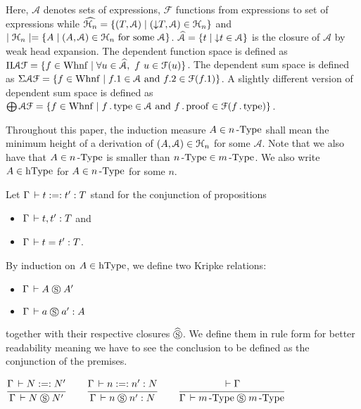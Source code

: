\documentclass[a4paper,english]{lipics-utf8x}
\begin{document}
  \noindent %
  Here, $\mathcal{A}$ denotes sets of expressions, $\mathcal{F}$ functions from
  expressions to set of expressions while
  $\widehat{\mathcal{H}_n} = \{ (T,\mathcal{A}) \mid ({\downarrow} T, \mathcal{A}) \in \mathcal{H}_n \}$
  and $\mid \mathcal{H}_n \mid = \{ A \mid (A, \mathcal{A}) \in \mathcal{H}_n \text{ for some }
  \mathcal{A} \}$.
  $\widehat{\mathcal{A}} = \{ t \mid {\downarrow} t \in \mathcal{A} \}$ is the closure
  of $\mathcal{A}$ by weak head expansion.
  The dependent function space is defined as
  $\Pi \mathcal{A} \mathcal{F} = \{ f \in \operatorname{Whnf} \mid \forall u \in
  \widehat{\mathcal{A}},\ f~u \in \mathcal{F}(u) \}$.
  The dependent sum space is defined as
  $\Sigma \mathcal{A} \mathcal{F} = \{ f \in \operatorname{Whnf} \mid f.1 \in \mathcal{A}
  \text{ and } f.2 \in \mathcal{F}(f.1) \}$.
  A slightly different version of dependent sum space is defined as
  $\bigoplus \mathcal{A} \mathcal{F} = \{ f \in \operatorname{Whnf} \mid f \operatorname{.type} \in
  \mathcal{A} \text{ and } f \operatorname{.proof} \in \mathcal{F}(f \operatorname{.type}) \}$.

  Throughout this paper, the induction measure $A \in n\operatorname{-Type}$ shall mean the
  minimum height of a derivation of $(A, \mathcal{A}) \in \mathcal{H}_n$ for some
  $\mathcal{A}$.
  Note that we also have that $A \in n\operatorname{-Type}$ is smaller than
  $n\operatorname{-Type} \in m\operatorname{-Type}$.
  We also write $A \in \operatorname{hType}$ for $A \in n\operatorname{-Type}$ for some $n$.

  Let $\Gamma \,\vdash t :=: t' : T$ stand for the conjunction of propositions
  \begin{itemize}
    \item $\Gamma \,\vdash t,t' : T$ and
    \item $\Gamma \,\vdash t = t' : T$.
  \end{itemize}
  By induction on $A \in \operatorname{hType}$, we define two Kripke relations:
  \begin{itemize}
    \item $\Gamma \,\vdash A \mathrel{\circledS} A'$
    \item $\Gamma \,\vdash a \mathrel{\circledS} a' : A$
  \end{itemize}
  together with their respective closures $\mathrel{\widehat{\mathrel{\circledS}}}$.
  We define them in rule form for better readability meaning we have to see the
  conclusion to be defined as the conjunction of the premises.

  \begin{center}
  \(
    \ru{\Gamma \der N :=: N'
      }{\Gamma \der N \Sr N'}
    \qquad
    \ru{\Gamma \der n :=: n' : N
      }{\Gamma \der n \Sr n' : N}
    \qquad
    \ru{\der \Gamma
      }{\Gamma \der \nType{m} \Sr \nType{m}}
  \)
  \end{center}
\end{document}
